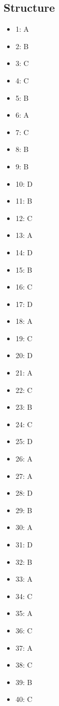 \documentclass[12pt]{article}
\begin{document}
\subsection*{Structure}
\begin{itemize}[leftmargin=*]
\item 1: A
\item 2: B
\item 3: C
\item 4: C
\item 5: B
\item 6: A
\item 7: C
\item 8: B
\item 9: B
\item 10: D
\item 11: B
\item 12: C
\item 13: A
\item 14: D
\item 15: B
\item 16: C
\item 17: D
\item 18: A
\item 19: C
\item 20: D
\item 21: A
\item 22: C
\item 23: B
\item 24: C
\item 25: D
\item 26: A
\item 27: A
\item 28: D
\item 29: B
\item 30: A
\item 31: D
\item 32: B
\item 33: A
\item 34: C
\item 35: A
\item 36: C
\item 37: A
\item 38: C
\item 39: B
\item 40: C
\end{itemize}
\end{document}
